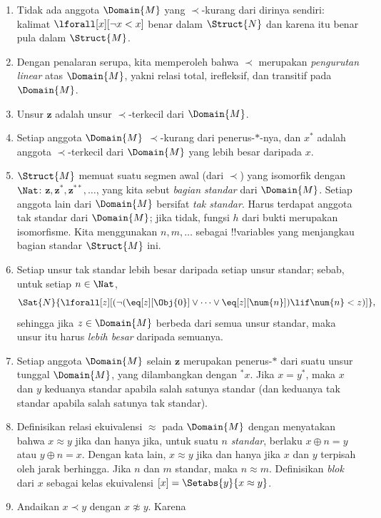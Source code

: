 \documentclass[../../../include/open-logic-section]{subfiles}
\begin{document}
\begin{enumerate}
\item Tidak ada anggota $\Domain{M}$ yang $\prec$-kurang dari dirinya
  sendiri: kalimat $\lforall[x][\lnot x < x]$ benar dalam $\Struct{N}$ dan
  karena itu benar pula dalam $\Struct{M}$.
\item Dengan penalaran serupa, kita memperoleh bahwa $\prec$ merupakan
  \emph{pengurutan linear} atas $\Domain{M}$, yakni relasi total, irefleksif,
  dan transitif pada $\Domain{M}$.
\item Unsur $\mathbf{z}$ adalah unsur $\prec$-terkecil dari $\Domain{M}$.
\item Setiap anggota $\Domain{M}$ $\prec$-kurang dari penerus-$*$-nya, dan
  $x^*$ adalah anggota $\prec$-terkecil dari $\Domain{M}$ yang lebih besar
  daripada $x$.
\item $\Struct{M}$ memuat suatu segmen awal (dari $\prec$) yang isomorfik
  dengan $\Nat$: $\mathbf{z}, \mathbf{z}^*, \mathbf{z}^{**}, \dots$, yang
  kita sebut \emph{bagian standar} dari $\Domain{M}$. Setiap anggota lain
  dari $\Domain{M}$ bersifat \emph{tak standar}. Harus terdapat anggota tak
  standar dari $\Domain{M}$; jika tidak, fungsi $h$ dari bukti
   merupakan isomorfisme. Kita menggunakan $n, m, \dots$
  sebagai !!{variable}s yang menjangkau bagian standar $\Struct{M}$ ini.
\item Setiap unsur tak standar lebih besar daripada setiap unsur standar;
  sebab, untuk setiap $n \in \Nat$,
  \[
  \Sat{N}{\lforall[z][(\lnot(\eq[z][\Obj{0}] \lor
  \dots \lor \eq[z][\num{n}]) \lif \num{n} < z)]},
  \]
  sehingga jika $z \in \Domain{M}$ berbeda dari semua unsur standar, maka
  unsur itu harus \emph{lebih besar} daripada semuanya.
\item Setiap anggota $\Domain{M}$ selain $\mathbf{z}$ merupakan
  penerus-$*$ dari suatu unsur tunggal $\Domain{M}$, yang dilambangkan
  dengan $^*x$. Jika $x = y^*$, maka $x$ dan $y$ keduanya standar apabila
  salah satunya standar (dan keduanya tak standar apabila salah satunya tak
  standar).
\item Definisikan relasi ekuivalensi $\approx$ pada $\Domain{M}$ dengan
  menyatakan bahwa $x \approx y$ jika dan hanya jika, untuk suatu $n$
  \emph{standar}, berlaku $x \oplus n = y$ atau $y \oplus n =x$. Dengan
  kata lain, $x \approx y$ jika dan hanya jika $x$ dan $y$ terpisah oleh
  jarak berhingga. Jika $n$ dan $m$ standar, maka $n \approx m$. Definisikan
  \emph{blok} dari $x$ sebagai kelas ekuivalensi $[x] = \Setabs{y}{x
  \approx y}$.
\item Andaikan $x \prec y$ dengan $x \not\approx y$. Karena

\end{enumerate}
\end{document}

